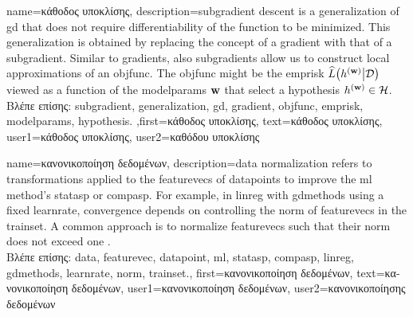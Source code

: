 {name={\foreignlanguage{greek}{κάθοδος υποκλίσης}}, 
	description={\Gls{subgradient} 
		descent is a \gls{generalization} of \gls{gd} that does not require differentiability of the 
		function to be minimized. This \gls{generalization} is obtained by replacing the concept 
		of a \gls{gradient} with that of a \gls{subgradient}. Similar to \gls{gradient}s, also \gls{subgradient}s 
		allow us to construct local approximations of an \gls{objfunc}. The \gls{objfunc} 
		might be the \gls{emprisk} $\widehat{L}\big( h^{({\bf w})} \big| \mathcal{D} \big)$ viewed 
		as a function of the \gls{modelparams} ${\bf w}$ that select a \gls{hypothesis} $h^{({\bf w})} \in \mathcal{H}$.\\
		\foreignlanguage{greek}{Βλέπε επίσης:} \gls{subgradient}, \gls{generalization}, \gls{gd}, \gls{gradient}, \gls{objfunc}, \gls{emprisk}, \gls{modelparams}, \gls{hypothesis}.
		},first={\foreignlanguage{greek}{κάθοδος υποκλίσης}},
		text={\foreignlanguage{greek}{κάθοδος υποκλίσης}},
		user1={\foreignlanguage{greek}{κάθοδος υποκλίσης}}, %
		user2={\foreignlanguage{greek}{καθόδου υποκλίσης}} %
}

{name={\foreignlanguage{greek}{κανονικοποίηση δεδομένων}},
	description={\Gls{data} normalization refers to transformations 
		applied to the \gls{featurevec}s of \gls{datapoint}s to improve the \gls{ml} method's 
		\gls{statasp} or \gls{compasp}. For example, in \gls{linreg} with \gls{gdmethods} using 
		a fixed \gls{learnrate}, convergence depends on controlling the \gls{norm} of \gls{featurevec}s 
		in the \gls{trainset}. A common approach is to normalize \gls{featurevec}s such that their 
		\gls{norm} does not exceed one \cite[Ch.\ 5]{MLBasics}.\\
		\foreignlanguage{greek}{Βλέπε επίσης:} \gls{data}, \gls{featurevec}, \gls{datapoint}, \gls{ml}, \gls{statasp}, \gls{compasp}, \gls{linreg}, \gls{gdmethods}, \gls{learnrate}, \gls{norm}, \gls{trainset}.},
	first={\foreignlanguage{greek}{κανονικοποίηση δεδομένων}},
	text={\foreignlanguage{greek}{κανονικοποίηση δεδομένων}},
	user1={\foreignlanguage{greek}{κανονικοποίηση δεδομένων}}, %
  	user2={\foreignlanguage{greek}{κανονικοποίησης δεδομένων}} %
}

